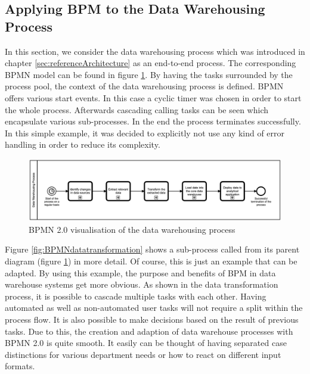 \subsection{Applying BPM to the Data Warehousing Process}
In this section, we consider the data warehousing process which was introduced in chapter \ref{sec:referenceArchitecture} as an end-to-end process. The corresponding BPMN model can be found in figure \ref{fig:BPMNdatawarehousing}.\newline
By having the tasks surrounded by the process pool, the context of the data warehousing process is defined. BPMN offers various start events. In this case a cyclic timer was chosen in order to start the whole process. Afterwards cascading calling tasks can be seen which encapsulate various sub-processes. In the end the process terminates successfully. In this simple example, it was decided to explicitly not use any kind of error handling in order to reduce its complexity.\newline
\\
\begin{figure}[!htb]
    \centering
    \includegraphics[scale=0.15]{pictures/DataWarehousingProcess.png}
    \caption{BPMN 2.0 visualisation of the data warehousing process}
    \label{fig:BPMNdatawarehousing}
\end{figure}
Figure \ref{fig:BPMNdatatransformation} shows a sub-process called from its parent diagram (figure \ref{fig:BPMNdatawarehousing}) in more detail. Of course, this is just an example that can be adapted. By using this example, the purpose and benefits of BPM in data warehouse systems get more obvious.\newline
As shown in the data transformation process, it is possible to cascade multiple tasks with each other. Having automated as well as non-automated user tasks will not require a split within the process flow. It is also possible to make decisions based on the result of previous tasks. Due to this, the creation and adaption of data warehouse processes with BPMN 2.0 is quite smooth. It easily can be thought of having separated case distinctions for various department needs or how to react on different input formats.\newline 
